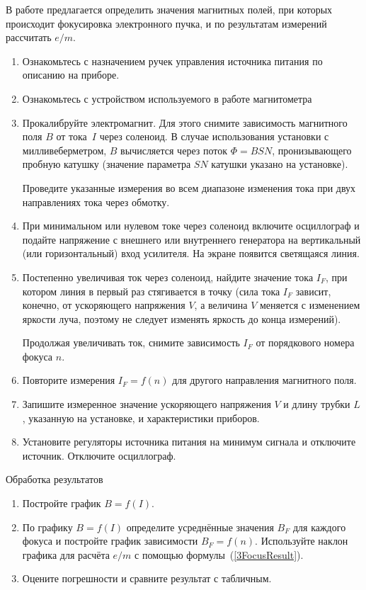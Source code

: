 В работе предлагается определить значения магнитных полей, при которых происходит фокусировка электронного пучка, и по результатам измерений рассчитать $e/m$.

\begin{enumerate}
\item{Ознакомьтесь с назначением ручек управления источника питания по описанию на приборе.}
\item{Ознакомьтесь с устройством используемого в работе магнитометра}
\item{ Прокалибруйте электромагнит. Для этого снимите зависимость магнитного поля $B$ от тока~$I$ через соленоид.  В случае использования установки с милливеберметром, $B$ вычисляется через поток $\Phi=BSN$, пронизывающего пробную катушку (значение параметра $SN$ катушки указано на установке).

Проведите указанные измерения во всем диапазоне изменения тока при двух направлениях тока через обмотку.}

\item{ При минимальном или нулевом токе через соленоид включите осциллограф  и подайте напряжение с внешнего или внутреннего генератора на вертикальный (или горизонтальный) вход усилителя. На экране появится светящаяся линия.}

\item{ Постепенно увеличивая ток через соленоид, найдите значение тока $I_F$, при котором линия в первый раз стягивается в точку (сила тока $I_F$ зависит, конечно, от ускоряющего напряжения $V$, а величина $V$ меняется с изменением яркости луча, поэтому не следует изменять яркость до конца измерений).

     Продолжая увеличивать ток, снимите зависимость $I_F$ от порядкового номера фокуса $n$.}
\item{ Повторите измерения $I_F=f(n)$ для другого направления магнитного поля.}
\item{ Запишите измеренное значение ускоряющего напряжения $V$ и длину трубки $L$, указанную на установке, и характеристики приборов.}
\item{Установите регуляторы источника питания на минимум сигнала и отключите источник. Отключите осциллограф.}
\end{enumerate}

{\rm Обработка результатов}

\begin{enumerate}
\item{Постройте график $B=f(I)$.}
\item{По графику $B=f(I)$ определите усреднённые значения $B_F$ для каждого фокуса и постройте график зависимости $B_F=f(n)$. Используйте наклон графика для расчёта $e/m$ с помощью формулы~(\ref{3FocusResult}).}
\item{Оцените погрешности и сравните результат с табличным.}

\end{enumerate}


